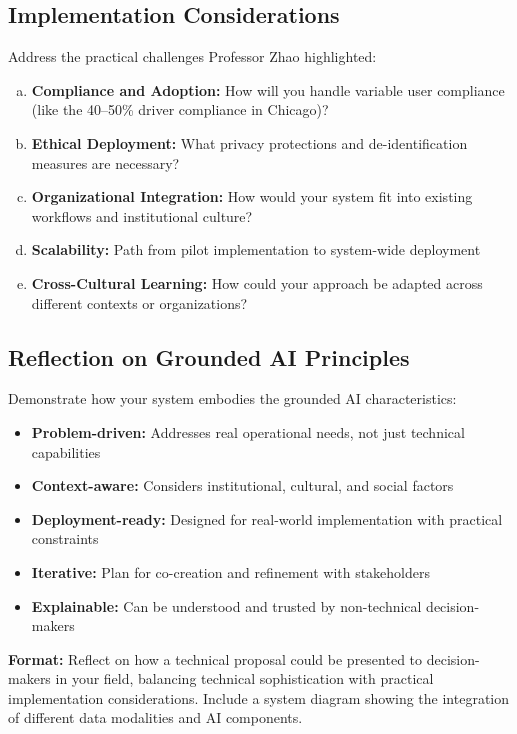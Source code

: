 \documentclass[11pt]{article}
\begin{document}
\subsection*{Implementation Considerations}
Address the practical challenges Professor Zhao highlighted:

\begin{enumerate}[(a)]
\item \textbf{Compliance and Adoption:} How will you handle variable user compliance (like the 40--50\% driver compliance in Chicago)?
\item \textbf{Ethical Deployment:} What privacy protections and de-identification measures are necessary?
\item \textbf{Organizational Integration:} How would your system fit into existing workflows and institutional culture?
\item \textbf{Scalability:} Path from pilot implementation to system-wide deployment
\item \textbf{Cross-Cultural Learning:} How could your approach be adapted across different contexts or organizations?
\end{enumerate}

\subsection*{Reflection on Grounded AI Principles}
Demonstrate how your system embodies the grounded AI characteristics:
\begin{itemize}
\item \textbf{Problem-driven:} Addresses real operational needs, not just technical capabilities
\item \textbf{Context-aware:} Considers institutional, cultural, and social factors
\item \textbf{Deployment-ready:} Designed for real-world implementation with practical constraints
\item \textbf{Iterative:} Plan for co-creation and refinement with stakeholders
\item \textbf{Explainable:} Can be understood and trusted by non-technical decision-makers
\end{itemize}

\noindent\textbf{Format:} Reflect on how a technical proposal could be presented to decision-makers in your field, balancing technical sophistication with practical implementation considerations. Include a system diagram showing the integration of different data modalities and AI components.
\end{document}
